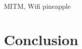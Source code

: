 \documentclass[12pt,a4paper,oneside,pdftex]{report}
\begin{document}
MITM, Wifi pineapple

\chapter{Conclusion}
\label{chapter:conclusion}


% 





\end{document}
